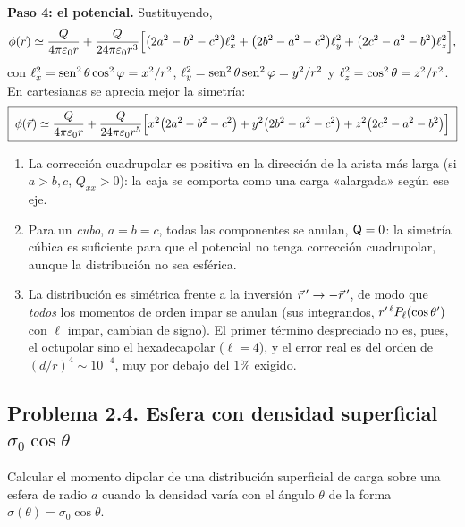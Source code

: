 \begin{resolucion}
\textbf{Paso 4: el potencial.} Sustituyendo,
\[
  \phi(\vec{r})\simeq\frac{Q}{4\pi\varepsilon_{0} r}+\frac{Q}{24\pi\varepsilon_{0} r^{3}}\Bigl[\bigl(2a^{2}-b^{2}-c^{2}\bigr)\ell_{x}^{2}+\bigl(2b^{2}-a^{2}-c^{2}\bigr)\ell_{y}^{2}+\bigl(2c^{2}-a^{2}-b^{2}\bigr)\ell_{z}^{2}\Bigr],
\]
con $\ell_{x}^{2}=\operatorname{sen}^{2}\theta\cos^{2}\varphi=x^{2}/r^{2}$, $\ell_{y}^{2}=\operatorname{sen}^{2}\theta\operatorname{sen}^{2}\varphi=y^{2}/r^{2}$ y $\ell_{z}^{2}=\cos^{2}\theta=z^{2}/r^{2}$. En cartesianas se aprecia mejor la simetría:
\[
  \boxed{\;\phi(\vec{r})\simeq\frac{Q}{4\pi\varepsilon_{0} r}+\frac{Q}{24\pi\varepsilon_{0} r^{5}}\Bigl[x^{2}\bigl(2a^{2}-b^{2}-c^{2}\bigr)+y^{2}\bigl(2b^{2}-a^{2}-c^{2}\bigr)+z^{2}\bigl(2c^{2}-a^{2}-b^{2}\bigr)\Bigr]\;}
\]
\end{resolucion}



\begin{observacion}\label{obs:sem-paralelepipedo}
\begin{enumerate}[label=(\alph*)]
  \item La corrección cuadrupolar es positiva en la dirección de la arista más larga (si $a>b,c$, $Q_{xx}>0$): la caja se comporta como una carga «alargada» según ese eje.
  \item Para un \emph{cubo}, $a=b=c$, todas las componentes se anulan, $\mathsf{Q}=0$: la simetría cúbica es suficiente para que el potencial no tenga corrección cuadrupolar, aunque la
        distribución no sea esférica.
  \item La distribución es simétrica frente a la inversión $\vec{r}\,'\to-\vec{r}\,'$, de modo que \emph{todos} los momentos de orden impar se anulan (sus integrandos, $r'^{\,\ell}P_{\ell}(\cos\theta')$
        con $\ell$ impar, cambian de signo). El primer término despreciado no es, pues, el octupolar sino el hexadecapolar ($\ell=4$), y el error real es del orden de $(d/r)^{4}\sim10^{-4}$,
        muy por debajo del $1\%$ exigido.
\end{enumerate}
\end{observacion}

\subsection{Problema 2.4. Esfera con densidad superficial \texorpdfstring{$\sigma_0\cos\theta$}{σ0 cos θ}}\label{sem:esfera-sigma}
\begin{ejercicio}\label{ejer:esfera-sigma}
Calcular el momento dipolar de una distribución superficial de carga sobre una esfera de radio $a$ cuando la densidad varía con el ángulo $\theta$ de la forma
$\sigma(\theta)=\sigma_0\cos\theta$.
\end{ejercicio}

